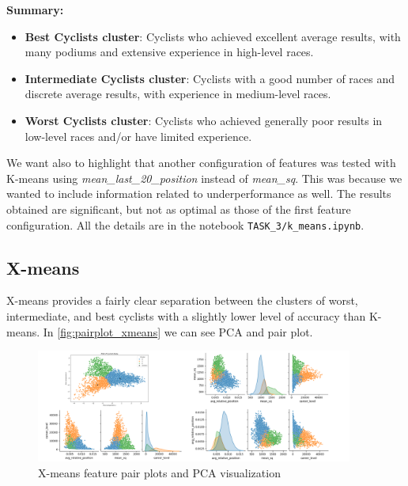 \noindent
\textbf{Summary:}    

\begin{itemize}
    \vspace{-0.20cm}
    \item \textbf{Best Cyclists cluster}: Cyclists who achieved excellent average results, with many podiums and extensive experience in high-level races.
    \vspace{-0.20cm}
    \item \textbf{Intermediate Cyclists cluster}: Cyclists with a good number of races and discrete average results, with experience in medium-level races.
    \vspace{-0.20cm}
    \item \textbf{Worst Cyclists cluster}: Cyclists who achieved generally poor results in low-level races and/or have limited experience.
\end{itemize}

We want also to highlight that another configuration of features was tested with K-means using \textit{mean\_last\_20\_position} instead of \textit{mean\_sq}. This was because we wanted to include information related to underperformance as well. The results obtained are significant, but not as optimal as those of the first feature configuration. All the details are in the notebook \texttt{TASK\_3/k\_means.ipynb}.



\subsection{X-means}
X-means provides a fairly clear separation between the clusters of worst, intermediate, and best cyclists with a slightly lower level of accuracy than K-means. In \autoref{fig:pairplot_xmeans} we can see PCA and pair plot.

\begin{figure}[H]
\centering
\includegraphics[width=0.93\textwidth]{images/CLUSTER/X-means/pairplot.png}
\caption{ \small  X-means feature pair plots and PCA visualization \small}
\label{fig:pairplot_xmeans}
\end{figure}

